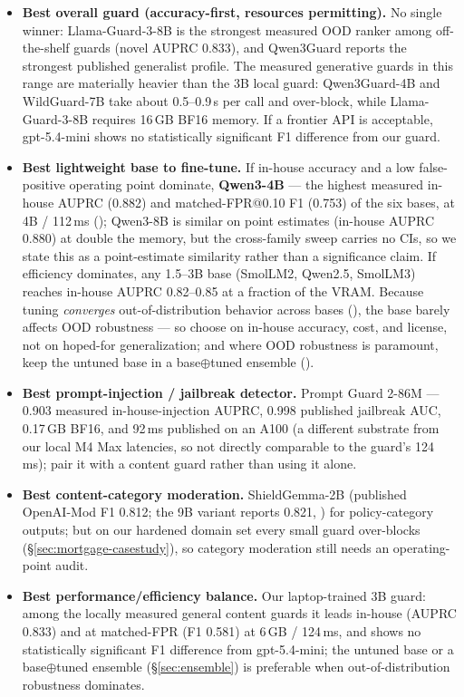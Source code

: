 \begin{itemize}
  \item \textbf{Best overall guard (accuracy-first, resources permitting).} No single winner: Llama-Guard-3-8B is the strongest measured OOD ranker among off-the-shelf guards (novel AUPRC 0.833), and Qwen3Guard reports the strongest published generalist profile. The measured generative guards in this range are materially heavier than the 3B local guard: Qwen3Guard-4B and WildGuard-7B take about 0.5--0.9\,s per call and over-block, while Llama-Guard-3-8B requires 16\,GB BF16 memory. If a frontier API is acceptable, gpt-5.4-mini shows no statistically significant F1 difference from our guard.
  \item \textbf{Best lightweight base to fine-tune.} If in-house accuracy and a low false-positive operating point dominate, \textbf{Qwen3-4B} --- the highest measured in-house AUPRC (0.882) and matched-FPR@0.10 F1 (0.753) of the six bases, at 4B / 112\,ms (); Qwen3-8B is similar on point estimates (in-house AUPRC 0.880) at double the memory, but the cross-family sweep carries no CIs, so we state this as a point-estimate similarity rather than a significance claim. If efficiency dominates, any 1.5--3B base (SmolLM2, Qwen2.5, SmolLM3) reaches in-house AUPRC 0.82--0.85 at a fraction of the VRAM. Because tuning \emph{converges} out-of-distribution behavior across bases (), the base barely affects OOD robustness --- so choose on in-house accuracy, cost, and license, not on hoped-for generalization; and where OOD robustness is paramount, keep the untuned base in a base$\oplus$tuned ensemble ().
  \item \textbf{Best prompt-injection / jailbreak detector.} Prompt Guard 2-86M --- 0.903 measured in-house-injection AUPRC, 0.998 published jailbreak AUC, 0.17\,GB BF16, and 92\,ms published on an A100 (a different substrate from our local M4 Max latencies, so not directly comparable to the guard's 124\,ms); pair it with a content guard rather than using it alone.
  \item \textbf{Best content-category moderation.} ShieldGemma-2B (published OpenAI-Mod F1 0.812; the 9B variant reports 0.821, ) for policy-category outputs; but on our hardened domain set every small guard over-blocks (\S\ref{sec:mortgage-casestudy}), so category moderation still needs an operating-point audit.
  \item \textbf{Best performance/efficiency balance.} Our laptop-trained 3B guard: among the locally measured general content guards it leads in-house (AUPRC 0.833) and at matched-FPR (F1 0.581) at 6\,GB / 124\,ms, and shows no statistically significant F1 difference from gpt-5.4-mini; the untuned base or a base$\oplus$tuned ensemble (\S\ref{sec:ensemble}) is preferable when out-of-distribution robustness dominates.

\end{itemize}
